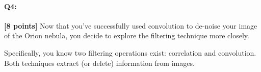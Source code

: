 

\pagebreak
\paragraph{Q4:} \textbf{[8 points]} Now that you've successfully used convolution to de-noise your image of the Orion nebula, you decide to explore the filtering technique more closely. 

Specifically, you know two filtering operations exist: correlation and convolution. Both techniques extract (or delete) information from images.

